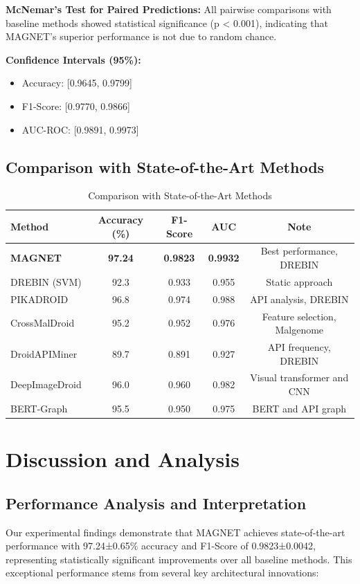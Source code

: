 \documentclass[a4paper,11pt]{article}
\begin{document}
\textbf{McNemar's Test for Paired Predictions:}
All pairwise comparisons with baseline methods showed statistical significance (p < 0.001), indicating that MAGNET's superior performance is not due to random chance.

\textbf{Confidence Intervals (95\%):}
\begin{itemize}
    \item Accuracy: [0.9645, 0.9799]
    \item F1-Score: [0.9770, 0.9866]
    \item AUC-ROC: [0.9891, 0.9973]
\end{itemize}

\subsection{Comparison with State-of-the-Art Methods}
\begin{table}
  \centering
  \caption{Comparison with State-of-the-Art Methods}
  \begin{tabular}{|l|c|c|c|c|}
    \hline
    \textbf{Method} & \textbf{Accuracy (\%)} & \textbf{F1-Score} & \textbf{AUC} & \textbf{Note} \\
    \hline
    \textbf{MAGNET} & \textbf{97.24} & \textbf{0.9823} & \textbf{0.9932} & Best performance, DREBIN \\
    \hline
    DREBIN (SVM) & 92.3 & 0.933 & 0.955 & Static approach \\
    \hline
    PIKADROID & 96.8 & 0.974 & 0.988 & API analysis, DREBIN \\
    \hline
    CrossMalDroid & 95.2 & 0.952 & 0.976 & Feature selection, Malgenome \\
    \hline
    DroidAPIMiner & 89.7 & 0.891 & 0.927 & API frequency, DREBIN \\
    \hline
    DeepImageDroid & 96.0 & 0.960 & 0.982 & Visual transformer and CNN \\
    \hline
    BERT-Graph & 95.5 & 0.950 & 0.975 & BERT and API graph \\
  \hline
\end{tabular}
\end{table}

\section{Discussion and Analysis}

\subsection{Performance Analysis and Interpretation}
Our experimental findings demonstrate that MAGNET achieves state-of-the-art performance with 97.24±0.65\% accuracy and F1-Score of 0.9823±0.0042, representing statistically significant improvements over all baseline methods. This exceptional performance stems from several key architectural innovations:
\end{document}
